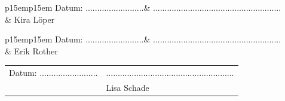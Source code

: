 \documentclass[12pt,a4paper,bibliography=totocnumbered,listof=totocnumbered]{scrartcl}
\begin{document}
\vspace{1cm}
\begin{minipage}{\linewidth}
	\begin{tabular}{p{15em}p{15em}}
		Datum: .........................&  .......................................................\\
		& Kira Löper
	\end{tabular}
\end{minipage}\vspace{0.5cm}

\vspace{1cm}
\begin{minipage}{\linewidth}
	\begin{tabular}{p{15em}p{15em}}
		Datum: .........................&  .......................................................\\
		& Erik Rother
	\end{tabular}
\end{minipage}\vspace{0.5cm}

\vspace{1cm}
\begin{minipage}{\linewidth}
	\begin{tabular}{p{15em}p{15em}}
		Datum: .........................&  .......................................................\\
		& Lisa Schade
	\end{tabular}
\end{minipage}\vspace{0.5cm}
\newpage
\renewcommand{\cfttabpresnum}{Tab. }
\renewcommand{\cftfigpresnum}{Abb. }
\settowidth{\cfttabnumwidth}{Abb. 10\quad}
\settowidth{\cftfignumwidth}{Abb. 10\quad}

\singlespacing
{}
\tableofcontents
\pagebreak


\renewcommand{\sectionmark}[1]{\markright{#1}}
\renewcommand{\subsectionmark}[1]{}
\renewcommand{\subsubsectionmark}[1]{}
\rhead{\rightmark}
\end{document}
